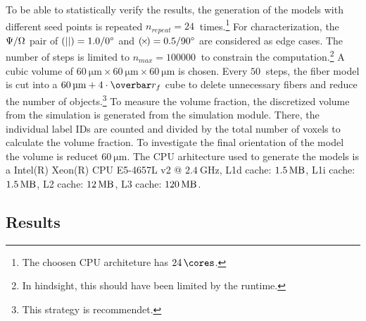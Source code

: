 %
To be able to statistically verify the results, the generation of the models with different seed points is repeated $n_{\mathit{repeat}} = \SI{24}{}$ times.\footnote{The choosen \ac{CPU} architeture has $\SI{24}{\cores}$.}
For characterization, the $\textnormal{$\Psi$}/\textnormal{$\Omega$}$ pair of $\textnormal{$(||)$} = \SI{1.0}{}/\SI{0}{\degree}$ and $\textnormal{$(\!\times\!)$}=\SI{0.5}{}/\SI{90}{\degree}$ are considered as edge cases.
The number of steps is limited to $n_{\mathit{max}}=\SI{100000}{}$ to constrain the computation.\footnote{In hindsight, this should have been limited by the runtime.}
A cubic volume of $\SI{60}{\micro\meter} \times \SI{60}{\micro\meter} \times \SI{60}{\micro\meter}$ is chosen.
Every $\SI{50}{}$ steps, the fiber model is cut into a $\SI{60}{\micro\meter}+4 \cdot \fiberRadiusMean$ cube to delete unnecessary fibers and reduce the number of objects.\footnote{This strategy is recommendet.}
To measure the volume fraction, the discretized volume from the simulation is generated from the simulation module.
There, the individual label IDs are counted and divided by the total number of voxels to calculate the volume fraction.
To investigate the final orientation of the model the volume is reducet $\SI{60}{\micro\meter}$.
The \ac{CPU} arhitecture used to generate the models is a
Intel(R) Xeon(R) CPU E5-4657L v2 @ $\SI{2.4}{\giga\hertz}$, L1d cache: $\SI{1.5}{\mega\byte}$, L1i cache: $\SI{1.5}{\mega\byte}$, L2 cache: $\SI{12}{\mega\byte}$, L3 cache: $\SI{120}{\mega\byte}$.
%
%
%
\subsection{Results} \label{sec:solverParameterResults}
%
